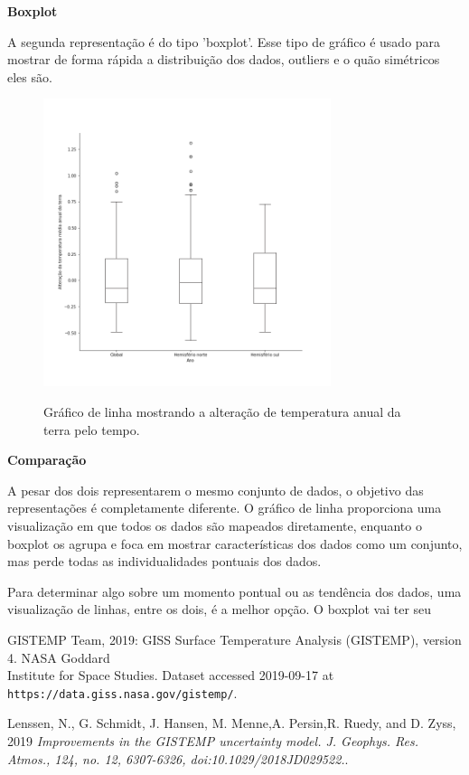 \documentclass[12pt]{article}
\begin{document}
\textbf{\Large Boxplot}\par
A segunda representação é do tipo 'boxplot'. Esse tipo de gráfico é usado para mostrar de forma rápida a distribuição dos dados, outliers e o quão simétricos eles são.
\setcounter{figure}{1}
\begin{figure}[H]
	\centering
	\includegraphics[width = 0.75\textwidth]{boxplot.png}
	\label{fig:A.2}
	\caption{Gráfico de linha mostrando a alteração de temperatura anual da terra pelo tempo.}
\end{figure}

\textbf{\Large Comparação} \par
A pesar dos dois representarem o mesmo conjunto de dados, o objetivo das representações é completamente diferente. O gráfico de linha proporciona uma visualização em que todos os dados são mapeados diretamente, enquanto o boxplot os agrupa e foca em mostrar características dos dados como um conjunto, mas perde todas as individualidades pontuais dos dados. \par
Para determinar algo sobre um momento pontual ou as tendência dos dados, uma visualização de linhas, entre os dois, é a melhor opção. O boxplot vai ter seu 

\newpage
\begin{thebibliography}{9}
	GISTEMP Team, 2019: GISS Surface Temperature Analysis (GISTEMP), version 4. NASA Goddard \\
	Institute for Space Studies. Dataset accessed 2019-09-17 at \\\texttt{https://data.giss.nasa.gov/gistemp/}.
	
	Lenssen, N., G. Schmidt, J. Hansen, M. Menne,A. Persin,R. Ruedy, and D. Zyss, 2019 
	\textit{Improvements in the GISTEMP uncertainty model. J. Geophys. Res. Atmos., 124, no. 12, 6307-6326, doi:10.1029/2018JD029522.}.
\end{thebibliography}
\end{document}
